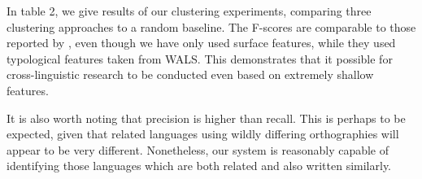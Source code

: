 In table 2, we give results of our clustering experiments, comparing three clustering approaches to a random baseline.  The F-scores are comparable to those reported by , even though we have only used surface features, while they used typological features taken from WALS.  This demonstrates that it possible for cross-linguistic research to be conducted even based on extremely shallow features.




It is also worth noting that precision is higher than recall.  This is perhaps to be expected, given that related languages using wildly differing orthographies will appear to be very different.  Nonetheless, our system is reasonably capable of identifying those languages which are both related and also written similarly.
